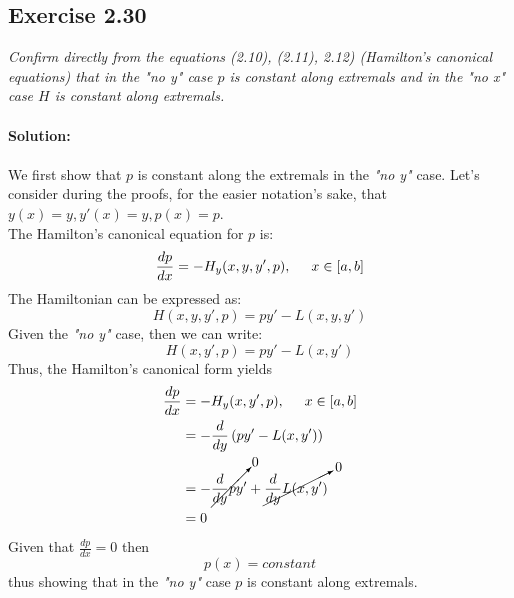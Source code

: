 \subsection{Exercise 2.30}
\emph{Confirm directly from the equations (2.10), (2.11), 2.12) (Hamilton's canonical equations) that in the "no y" case $p$ is constant along extremals and in the "no x" case $H$ is constant along extremals.}\\
\\
\textbf{Solution:}\\
\\
We first show that $p$ is constant along the extremals in the \emph{"no y"} case. Let's consider during the proofs, for the easier notation's sake, that $y(x) = y, y'(x) = y, p(x) = p$.\\
The Hamilton's canonical equation for $p$ is:
\begin{equation}
    \frac{dp}{dx} = - H_y (x, y, y', p), \hspace{0.5cm} x \in [a,b]
\end{equation}
The Hamiltonian can be expressed as:
\begin{equation}
    H(x, y, y', p) = py' - L(x, y, y')
\end{equation}
Given the \emph{"no y"} case, then we can write:
\begin{equation}
    H(x, y', p) = py' - L(x, y')
\end{equation}
Thus, the Hamilton's canonical form yields
\begin{align}
    \frac{dp}{dx} &= - H_y (x, y', p), \hspace{0.5cm} x \in [a,b] \\
    &= - \frac{d}{dy} \left( py' - L(x, y') \right) \\
    &= - \cancelto{0}{\frac{d}{dy} py'} + \cancelto{0}{\frac{d}{dy} L(x, y')} \\
    &= 0
\end{align}
Given that $\frac{dp}{dx} = 0$ then
\begin{equation}
    p(x) = constant
\end{equation}
thus showing that in the \emph{"no y"} case $p$ is constant along extremals.\\


